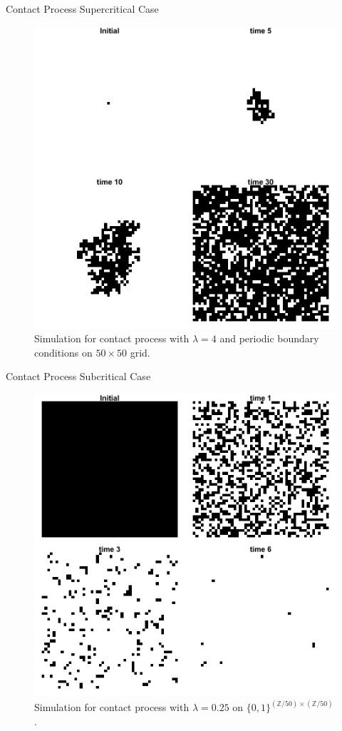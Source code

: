 \documentclass{beamer}
\theoremstyle{definition}
\newcommand{\Z}{\mathbb{Z}}
\begin{document}
\begin{frame}{Contact Process Supercritical Case}
    \begin{figure}[H]
  \centering
    \includegraphics[width=.65\textwidth]{figures/contact_simulation_torus_25.png}
   \caption{Simulation for contact process with $\lambda = 4$ and periodic boundary conditions on $50 \times 50$ grid.}
  \label{fig:contact_sim_torus_above_crit.png}
\end{figure}
\end{frame}

\begin{frame}{Contact Process Subcritical Case}
\begin{figure}[H]
  \centering
    \includegraphics[width=.65\textwidth]{figures/contact_simulation_torus_25_below_crit.png}
   \caption{Simulation for contact process with $\lambda = 0.25$ on $\{0,1\}^{(\Z/50) \times (\Z/50)}$.}
  \label{fig:contact_sim_torus_below_crit.png}
\end{figure}
\end{frame}
\end{document}
